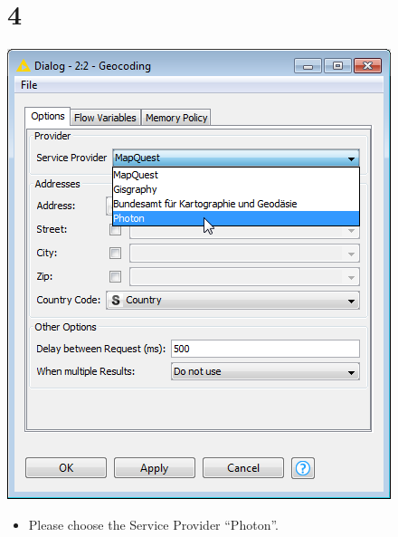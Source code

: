 \documentclass[10pt]{beamer}
\begin{document}
\section{4}
\begin{frame}
	\begin{center}
  		\includegraphics[height=0.6\textheight]{4.png}
	\end{center}
	\begin{itemize}
    \item Please choose the Service Provider ``Photon''.
	\end{itemize}
\end{frame}
\end{document}
